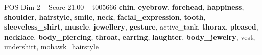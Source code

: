 \begin{textsample}{POS Dim 2 – Score 21.00 – t005666}  \label{ex:f2_pos_024}
\textbf{chin}, \textbf{eyebrow}, \textbf{forehead}, \textbf{happiness}, \textbf{shoulder}, \textbf{hairstyle}, \textbf{smile}, \textbf{neck}, \textbf{facial\_expression}, \textbf{tooth}, \textbf{sleeveless\_shirt}, \textbf{muscle}, \textbf{jewellery}, \textbf{gesture}, active\_tank, \textbf{thorax}, \textbf{pleased}, \textbf{necklace}, \textbf{body\_piercing}, \textbf{throat}, \textbf{earring}, \textbf{laughter}, \textbf{body\_jewelry}, vest, undershirt, mohawk\_hairstyle

\end{textsample}
